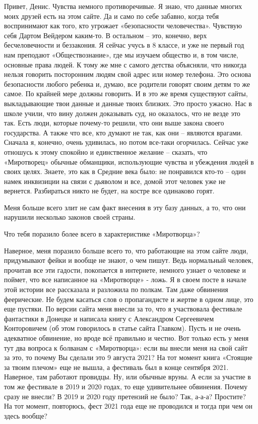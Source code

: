 Привет, Денис. Чувства немного противоречивые. Я знаю, что данные многих моих
друзей есть на этом сайте. Да и само по себе забавно, когда тебя воспринимают
как того, кто угрожает «безопасности человечества». Чувствую себя Дартом
Вейдером каким-то. В остальном – это, конечно, верх бесчеловечности и
беззакония. Я сейчас учусь в 8 классе, и уже не первый год нам преподают
«Обществознание», где мы изучаем общество и, в том числе, основные права людей.
К тому же мне с самого детства объясняли, что никогда нельзя говорить
посторонним людям свой адрес или номер телефона. Это основа безопасности любого
ребенка и, думаю, все родители говорят своим детям то же самое. По крайней мере
должны говорить. И в это же время существуют сайты, выкладывающие твои данные и
данные твоих близких. Это просто ужасно. Нас в школе учили, что вину должен
доказывать суд, но оказалось, что не везде это так. Есть люди, которые
почему-то решили, что они выше закона своего государства. А также что все, кто
думают не так, как они – являются врагами. Сначала я, конечно, очень удивилась,
но потом все-таки огорчилась. Сейчас уже отношусь к этому спокойно и
единственное желание – сказать, что «Миротворец» обычные обманщики,
использующие чувства и убеждения людей в своих целях. Знаете, это как в Средние
века было: не понравился кто-то – один намек инквизиции на связи с дьяволом и
все, домой этот человек уже не вернется. Разбираться никто не будет, на костре
все одинаково горят.

Меня больше всего злит не сам факт внесения в эту базу данных, а то, что они
нарушили несколько законов своей страны.

Что тебя поразило более всего в характеристике «Миротворца»?

Наверное, меня поразило больше всего то, что работающие на этом сайте люди,
придумывают фейки и вообще не знают, о чем пишут. Ведь нормальный человек,
прочитав все эти гадости, покопается в интернете, немного узнает о человеке и
поймет, что все написанное на «Миротворце» - ложь. Я в своем посте в начале
этой истории все рассказала и разложила по полкам. Там даже обвинения
феерические. Не будем касаться слов о пропагандисте и жертве в одном лице, это
еще пустяки. По версии сайта меня внесли за то, что я участвовала фестивале
фантастики в Донецке и написала книгу с Александром Сергеевичем Конторовичем
(об этом говорилось в статье сайта Главком). Пусть и не очень адекватное
обвинение, но вроде всё правильно и честно. Вот только есть у меня тут два
вопроса к болванам с «Миротворца»: если вы внесли меня на свой сайт за это, то
почему Вы сделали это 9 августа 2021? На тот момент книга «Стоящие за твоим
плечом» еще не вышла, а фестиваль был в конце сентября 2021. Наверное, там
работают провидцы. Ну, или обычные вруны. А если за участие в том же фестивале
в 2019 и 2020 годах, то еще удивительнее обвинения. Почему сразу не внесли? В
2019 и 2020 году претензий не было? Так, а-а-а? Простите? На тот момент,
повторюсь, фест 2021 года еще не проводился и тогда при чем он здесь вообще? 

